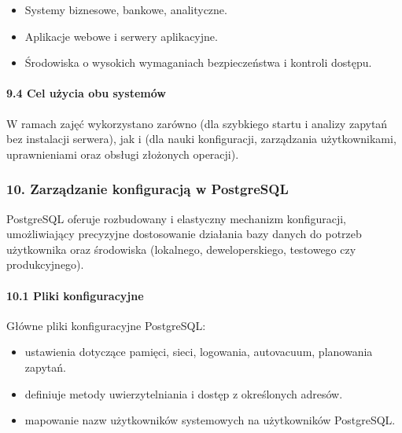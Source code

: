 \documentclass[letterpaper,10pt,polish]{sphinxmanual}
\begin{document}
\sphinxAtStartPar
{}
\begin{itemize}
\item {} 
\sphinxAtStartPar
Systemy biznesowe, bankowe, analityczne.

\item {} 
\sphinxAtStartPar
Aplikacje webowe i serwery aplikacyjne.

\item {} 
\sphinxAtStartPar
Środowiska o wysokich wymaganiach bezpieczeństwa i kontroli dostępu.

\end{itemize}


\paragraph{9.4 Cel użycia obu systemów}
\label{\detokenize{rozdzial2/Konfiguracja_baz_danych/Konfiguracja_baz_danych:cel-uzycia-obu-systemow}}
\sphinxAtStartPar
W ramach zajęć wykorzystano zarówno  (dla szybkiego startu i analizy zapytań bez instalacji serwera), jak i  (dla nauki konfiguracji, zarządzania użytkownikami, uprawnieniami oraz obsługi złożonych operacji).


\subsubsection{10. Zarządzanie konfiguracją w PostgreSQL}
\label{\detokenize{rozdzial2/Konfiguracja_baz_danych/Konfiguracja_baz_danych:zarzadzanie-konfiguracja-w-postgresql}}
\sphinxAtStartPar
PostgreSQL oferuje rozbudowany i elastyczny mechanizm konfiguracji, umożliwiający precyzyjne dostosowanie działania bazy danych do potrzeb użytkownika oraz środowiska (lokalnego, deweloperskiego, testowego czy produkcyjnego).


\paragraph{10.1 Pliki konfiguracyjne}
\label{\detokenize{rozdzial2/Konfiguracja_baz_danych/Konfiguracja_baz_danych:pliki-konfiguracyjne}}
\sphinxAtStartPar
Główne pliki konfiguracyjne PostgreSQL:
\begin{itemize}
\item {} 
\sphinxAtStartPar
{} \textendash{} ustawienia dotyczące pamięci, sieci, logowania, autovacuum, planowania zapytań.

\item {} 
\sphinxAtStartPar
{} \textendash{} definiuje metody uwierzytelniania i dostęp z określonych adresów.

\item {} 
\sphinxAtStartPar
{} \textendash{} mapowanie nazw użytkowników systemowych na użytkowników PostgreSQL.

\end{itemize}
\end{document}
